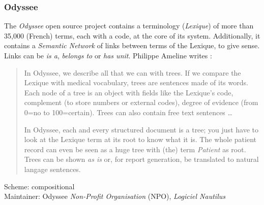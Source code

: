 %
%
%
%
%
%
%

\subsubsection{Odyssee}
\label{odyssee_heading}

The \emph{Odyssee} open source project \cite{nautilus} contains a terminology
(\emph{Lexique}) of more than 35,000 (French) terms, each with a code, at the
core of its system. Additionally, it contains a \emph{Semantic Network} of
links between terms of the Lexique, to give sense. Links can be \emph{is a},
\emph{belongs to} or \emph{has unit}. Philippe Ameline writes
\cite{openehrtechnical}:

\begin{quotation}
    In Odyssee, we describe all that we can with trees. If we compare the
    Lexique with medical vocabulary, trees are sentences made of its words.
    Each node of a tree is an object with fields like the Lexique's code,
    complement (to store numbers or external codes), degree of evidence (from
    0=no to 100=certain). Trees can also contain free text sentences \ldots

    In Odyssee, each and every structured document is a tree; you just have to
    look at the Lexique term at its root to know what it is. The whole patient
    record can even be seen as a huge tree with (the) term \emph{Patient} as
    root. Trees can be shown \emph{as is} or, for report generation, be
    translated to natural langage sentences.
\end{quotation}

Scheme: compositional\\
Maintainer: Odyssee \emph{Non-Profit Organisation} (NPO), \emph{Logiciel Nautilus}
